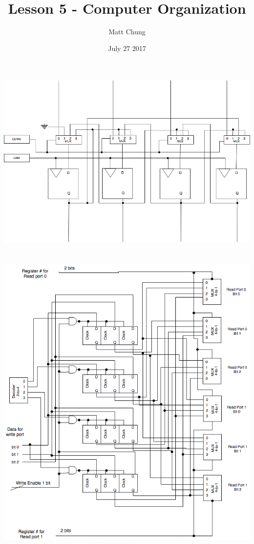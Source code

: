 \documentclass{article}
\title{Lesson 5 - Computer Organization}
\author{Matt Chung}
\date{July 27 2017}
\begin{document}
\maketitle

\section{}
\includegraphics[width=\textwidth, height=\textheight, keepaspectratio]{q1}

\section{}
\includegraphics[width=\textwidth, height=\textheight, keepaspectratio]{lesson-5-question-2}
\end{document}

